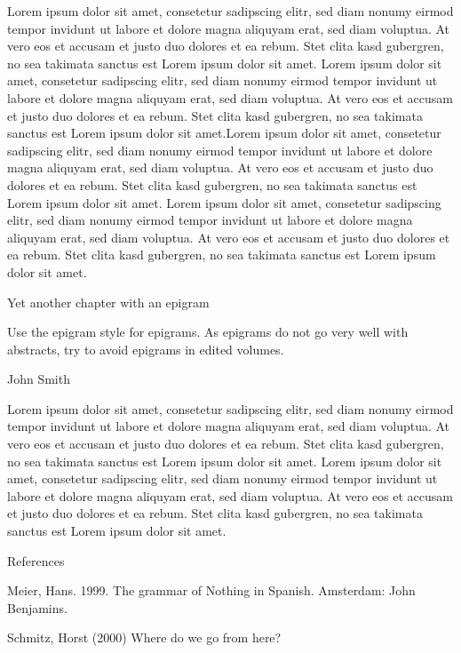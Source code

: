\begin{styleStandard}
Lorem ipsum dolor sit amet, consetetur sadipscing elitr, sed diam nonumy eirmod tempor invidunt ut labore et dolore magna aliquyam erat, sed diam voluptua. At vero eos et accusam et justo duo dolores et ea rebum. Stet clita kasd gubergren, no sea takimata sanctus est Lorem ipsum dolor sit amet. Lorem ipsum dolor sit amet, consetetur sadipscing elitr, sed diam nonumy eirmod tempor invidunt ut labore et dolore magna aliquyam erat, sed diam voluptua. At vero eos et accusam et justo duo dolores et ea rebum. Stet clita kasd gubergren, no sea takimata sanctus est Lorem ipsum dolor sit amet.Lorem ipsum dolor sit amet, consetetur sadipscing elitr, sed diam nonumy eirmod tempor invidunt ut labore et dolore magna aliquyam erat, sed diam voluptua. At vero eos et accusam et justo duo dolores et ea rebum. Stet clita kasd gubergren, no sea takimata sanctus est Lorem ipsum dolor sit amet. Lorem ipsum dolor sit amet, consetetur sadipscing elitr, sed diam nonumy eirmod tempor invidunt ut labore et dolore magna aliquyam erat, sed diam voluptua. At vero eos et accusam et justo duo dolores et ea rebum. Stet clita kasd gubergren, no sea takimata sanctus est Lorem ipsum dolor sit amet.
\end{styleStandard}

\clearpage\begin{styleHeadingi}
Yet another chapter with an epigram
\end{styleHeadingi}


\begin{styleListenabsatz}
Use the epigram style for epigrams. As epigrams do not go very well with abstracts, try to avoid epigrams in edited volumes.
\end{styleListenabsatz}

\begin{styleEpigramauthor}
John Smith
\end{styleEpigramauthor}

\begin{styleStandard}
Lorem ipsum dolor sit amet, consetetur sadipscing elitr, sed diam nonumy eirmod tempor invidunt ut labore et dolore magna aliquyam erat, sed diam voluptua. At vero eos et accusam et justo duo dolores et ea rebum. Stet clita kasd gubergren, no sea takimata sanctus est Lorem ipsum dolor sit amet. Lorem ipsum dolor sit amet, consetetur sadipscing elitr, sed diam nonumy eirmod tempor invidunt ut labore et dolore magna aliquyam erat, sed diam voluptua. At vero eos et accusam et justo duo dolores et ea rebum. Stet clita kasd gubergren, no sea takimata sanctus est Lorem ipsum dolor sit amet.
\end{styleStandard}

\begin{styleStandard}
References
\end{styleStandard}


\begin{styleStandard}
Meier, Hans. 1999. The grammar of Nothing in Spanish. Amsterdam: John Benjamins.
\end{styleStandard}


\begin{styleStandard}
Schmitz, Horst (2000) Where do we go from here?
\end{styleStandard}

